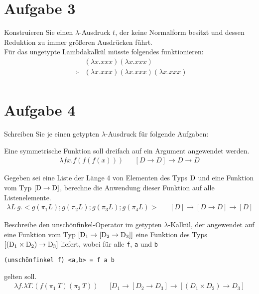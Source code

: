 \documentclass[ngerman,a4paper]{report}
\begin{document}
\section*{Aufgabe 3}
Konstruieren Sie einen $\lambda$-Ausdruck $t$, der keine Normalform besitzt und dessen Reduktion zu immer größeren Ausdrücken führt.\\
%
Für das ungetypte Lambdakalkül müsste folgendes funktionieren:\\
\begin{align*}
	&    (\lambda x.xxx)(\lambda x.xxx)\\
	\Rightarrow&(\lambda x.xxx)(\lambda x.xxx)(\lambda x.xxx)\\
\end{align*}
\section*{Aufgabe 4}
Schreiben Sie je einen getypten $\lambda$-Ausdruck für folgende Aufgaben:
\begin{compactenum}
\item Eine symmetrische Funktion soll dreifach auf ein Argument angewendet werden.
\begin{align*}
	\lambda fx.f(f(f(x)))&& [D \rightarrow D] \rightarrow D \rightarrow D
\end{align*}
\item Gegeben sei eine Liste der Länge $4$ von Elementen des Typs $\text{\lstinline!D!}$ und eine Funktion vom Typ $[\text{\lstinline!D!} \rightarrow \text{\lstinline!D!}]$, berechne die Anwendung dieser Funktion auf alle Listenelemente.
\begin{align*}
	\lambda L\ g.<g(\pi_1L);g(\pi_2L);g(\pi_3L);g(\pi_4L)>&& [D] \rightarrow [D\rightarrow D] \rightarrow [D]
\end{align*}
\item Beschreibe den unschönfinkel-Operator im getypten $\lambda$-Kalkül, der angewendet auf eine Funktion vom Typ $[\text{\lstinline!D!}_1 \rightarrow [\text{\lstinline!D!}_2 \rightarrow \text{\lstinline!D!}_3]]$ eine Funktion des Typs $[(\text{\lstinline!D!}_1 \times \text{\lstinline!D!}_2) \rightarrow \text{\lstinline!D!}_3]$ liefert, wobei für alle \lstinline!f!, \lstinline!a! und \lstinline!b!
\begin{lstlisting}
(unschönfinkel f) <a,b> = f a b
\end{lstlisting}
gelten soll.
\begin{align*}
	\lambda f. \lambda T.(f(\pi_1\ T) (\pi_2\ T))&& [D_1 \rightarrow [D_2 \rightarrow D_3] \rightarrow [(D_1\times D_2)\rightarrow D_3]
\end{align*}
\end{compactenum}
\end{document}
